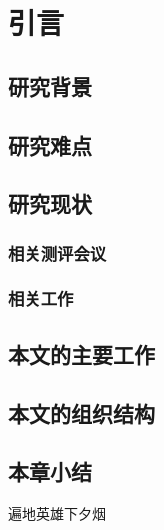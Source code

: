 

\chapter{引言}
    \section{研究背景}
    \section{研究难点}
    \section{研究现状}
        \subsection{相关测评会议}
        \subsection{相关工作}
    \section{本文的主要工作}
    \section{本文的组织结构}
    \section{本章小结}
    遍地英雄下夕烟~
